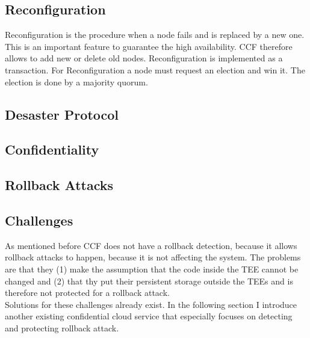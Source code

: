 \subsection{Reconfiguration}
Reconfiguration is the procedure when a node fails and is replaced by a new one. This is an important feature to guarantee the high availability. CCF therefore allows to add new or delete old nodes. Reconfiguration is implemented as a transaction. For Reconfiguration a node must request an election and win it. The election is done by a majority quorum. 
\subsection{Desaster Protocol}
\subsection{Confidentiality}
\subsection{Rollback Attacks}
\subsection{Challenges}
As mentioned before CCF does not have a rollback detection, because it allows rollback attacks to happen, because it is not affecting the system. The problems are that they (1) make the assumption that the code inside the TEE cannot be changed and (2) that thy put their persistent storage outside the TEEs and is therefore not protected for a rollback attack.\\
Solutions for these challenges already exist. In the following section I introduce another existing confidential cloud service that especially focuses on detecting and protecting rollback attack. 